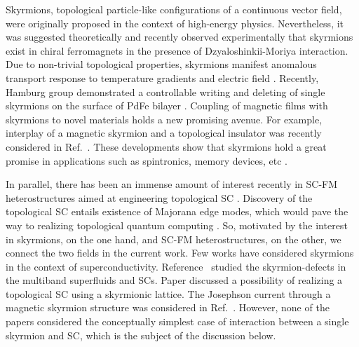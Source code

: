\documentclass[twocolumn,showpacs,floatfix,longbibliography]{revtex4-1}
\begin{document}
Skyrmions, topological particle-like configurations of a continuous vector field, were originally proposed in the context of high-energy physics.  Nevertheless, it was suggested theoretically \cite{Bogdanov1989,Rossler2006} and recently observed experimentally \cite{Muhlbauer2009,Munzer2010,Yu2011,Heinze2011,Seki2012} that skyrmions exist in chiral ferromagnets in the presence of Dzyaloshinkii-Moriya interaction. Due to non-trivial topological properties, skyrmions manifest anomalous transport response to temperature gradients \cite{Jonietz2010} and electric field \cite{Neubauer2009}. Recently, Hamburg group demonstrated a controllable writing and deleting of single skyrmions on the surface of PdFe bilayer \cite{Romming2013,Bergmann2014,Romming2015}. Coupling of magnetic films with skyrmions to novel materials holds a new promising avenue. For example, interplay of a magnetic skyrmion and a topological insulator was recently considered in Ref.~\cite{Hurst2015}. These developments show that skyrmions hold a great promise in applications such as spintronics, memory devices, etc \cite{Fert2013,Nagaosa2013}. 


In parallel, there has been an immense amount of interest recently in SC-FM heterostructures aimed at engineering topological SC \cite{Alicea2012}. Discovery of the topological SC entails existence of Majorana edge modes, which would pave the way to realizing topological quantum computing \cite{Nayak2008}. So, motivated by the interest in skyrmions, on the one hand, and SC-FM heterostructures, on the other, we connect the two fields in the current work. Few works have considered skyrmions in the context of superconductivity. Reference~\cite{Garaud2011} studied the skyrmion-defects in the multiband superfluids and SCs. Paper \cite{Nakosai2013} discussed a possibility of realizing a topological SC using a skyrmionic lattice. The Josephson current through a magnetic skyrmion structure was considered in Ref.~\cite{Yokoyama2015}. However, none of the papers considered the conceptually simplest case of interaction between a single skyrmion and SC, which is the subject of the discussion below.
\end{document}
